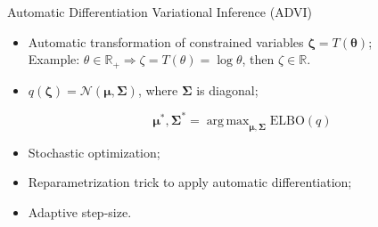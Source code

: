 \documentclass{beamer}
\DeclareMathOperator*{\argmax}{arg\,max}
\begin{document}
\begin{frame}{Automatic Differentiation Variational Inference (ADVI)}

\begin{itemize}
	\item Automatic transformation of constrained variables $\bm{\zeta} = T(\bm{\theta})$; \\
	Example: $\theta \in \mathbb{R}_{+} \Rightarrow \zeta = T(\theta) = \log \theta$, then $\zeta \in \mathbb{R}.$
	\vfill
	\item $q(\bm{\zeta}) = \mathcal{N}(\bm{\mu}, \bm{\Sigma})$, where $\bm{\Sigma}$ is diagonal;\\
	\begin{block}{}
	$$\bm{\mu}^*, \bm{\Sigma}^* = \argmax_{\bm{\mu}, \bm{\Sigma}} \text{ELBO}(q)$$
	\end{block}
	\vfill
	\item Stochastic optimization;
	\vfill
	\item Reparametrization trick to apply automatic differentiation;
	\vfill
	\item Adaptive step-size.
\end{itemize}
\end{frame}
\end{document}
